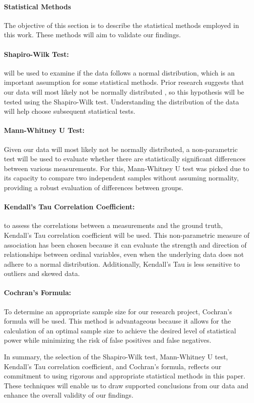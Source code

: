 \paragraph{Statistical Methods}
The objective of this section is to describe the statistical methods employed in this work. These methods will aim to validate our findings.

\paragraph{Shapiro-Wilk Test:} will be used to examine if the data follows a normal distribution, which is an important assumption for some statistical methods. Prior research suggests that our data will most likely not be normally distributed \cite{biksbois}, so this hypothesis will be tested using the Shapiro-Wilk test. Understanding the distribution of the data will help choose subsequent statistical tests.

\paragraph{Mann-Whitney U Test:}
Given our data will most likely not be normally distributed, a non-parametric test will be used to evaluate whether there are statistically significant differences between various measurements. For this, Mann-Whitney U test was picked due to its capacity to compare two independent samples without assuming normality, providing a robust evaluation of differences between groups.

\paragraph{Kendall's Tau Correlation Coefficient:}
to assess the correlations between a measurements and the ground truth, Kendall's Tau correlation coefficient will be used. This non-parametric measure of association has been chosen because it can evaluate the strength and direction of relationships between ordinal variables, even when the underlying data does not adhere to a normal distribution. Additionally, Kendall's Tau is less sensitive to outliers and skewed data.

\paragraph{Cochran's Formula:}
To determine an appropriate sample size for our research project, Cochran's formula will be used. This method is advantageous because it allows for the calculation of an optimal sample size to achieve the desired level of statistical power while minimizing the risk of false positives and false negatives.


In summary, the selection of the Shapiro-Wilk test, Mann-Whitney U test, Kendall's Tau correlation coefficient, and Cochran's formula, reflects our commitment to using rigorous and appropriate statistical methods in this paper. These techniques will enable us to draw supported conclusions from our data and enhance the overall validity of our findings.